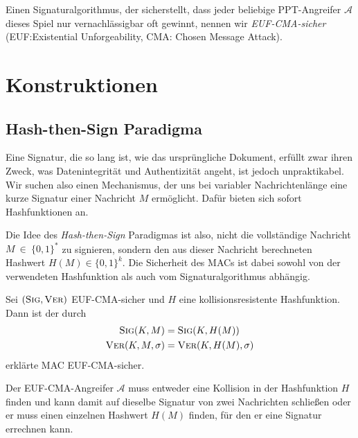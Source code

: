 Einen Signaturalgorithmus, der sicherstellt, dass jeder beliebige
PPT-Angreifer $\mathcal{A}$ dieses Spiel nur vernachlässigbar oft
gewinnt, nennen wir \textit{EUF-CMA-sicher} (EUF:Existential
Unforgeability, CMA: Chosen Message Attack).

\section{Konstruktionen}

\subsection{Hash-then-Sign Paradigma} Eine Signatur, die so lang ist,
wie das ursprüngliche Dokument, erfüllt zwar ihren Zweck, was
Datenintegrität und Authentizität angeht, ist jedoch unpraktikabel. Wir
suchen also einen Mechanismus, der uns bei variabler Nachrichtenlänge
eine kurze Signatur einer Nachricht $M$ ermöglicht. Dafür bieten sich
sofort Hashfunktionen an.

Die Idee des \emph{Hash-then-Sign} Paradigmas ist also, nicht die
vollständige Nachricht $M~\in~\{0,1\}^*$ zu signieren, sondern den aus
dieser Nachricht berechneten Hashwert $H(M) \in \{0,1\}^k$. Die
Sicherheit des MACs ist dabei sowohl von der verwendeten Hashfunktion
als auch vom Signaturalgorithmus abhängig.~\\

\begin{theorem} Sei $(\textsc{Sig}, \textsc{Ver})$ EUF-CMA-sicher und $H$ eine
  kollisionsresistente Hashfunktion. Dann ist der durch
  \begin{align*} \textsc{Sig}(K,M) &= \textsc{Sig}(K,H(M))\\ \textsc{Ver}(K,M,\sigma) &=
                                                                \textsc{Ver}(K,H(M),\sigma)
  \end{align*} erklärte MAC EUF-CMA-sicher.~\\
\end{theorem}

\begin{beweis}[Entwurf]
  \label{ch:symauth:eufcma-beweis} Der EUF-CMA-Angreifer $\mathcal{A}$
  muss entweder eine Kollision in der Hashfunktion $H$ finden und kann
  damit auf dieselbe Signatur von zwei Nachrichten schließen oder er muss
  einen einzelnen Hashwert $H(M)$ finden, für den er eine Signatur
  errechnen kann.
\end{beweis}

